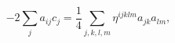 \begin{equation}
\label{eomfromfs}
- 2 \sum_j a_{ij} c_j = \frac{1}{4} \sum_{j,k,l,m} 
\eta^{ijklm} a_{jk} a_{lm},
\end{equation}

